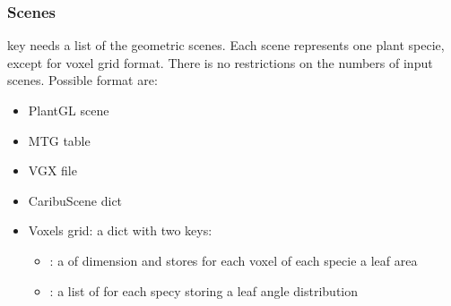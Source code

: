\documentclass[letterpaper,10pt,english]{sphinxmanual}
\begin{document}
\subsubsection{Scenes}
\label{\detokenize{inputs:scenes}}\label{\detokenize{inputs:id2}}
\sphinxAtStartPar
{} key needs a list of the geometric scenes.
Each scene represents one plant specie, except for voxel grid format. There is no restrictions on the numbers of input scenes.
Possible format are:
\begin{itemize}
\item {} 
\sphinxAtStartPar
PlantGL scene

\item {} 
\sphinxAtStartPar
MTG table

\item {} 
\sphinxAtStartPar
VGX file

\item {} 
\sphinxAtStartPar
CaribuScene dict
\begin{quote}

\begin{sphinxVerbatim}[commandchars=\\\{\}]
  \PYG{p}{[}          \PYG{p}{]}
  \PYG{p}{[}          \PYG{p}{]}
     \PYG{p}{[}   \PYG{p}{]} 

\end{sphinxVerbatim}
\end{quote}

\item {} 
\sphinxAtStartPar
Voxels grid: a dict with two keys:
\begin{itemize}
\item {} 
\sphinxAtStartPar
{}: a  of dimension  and stores for each voxel of each specie a leaf area

\item {} 
\sphinxAtStartPar
{}: a list of  for each specy storing a leaf angle distribution

\end{itemize}

\end{itemize}
\end{document}
